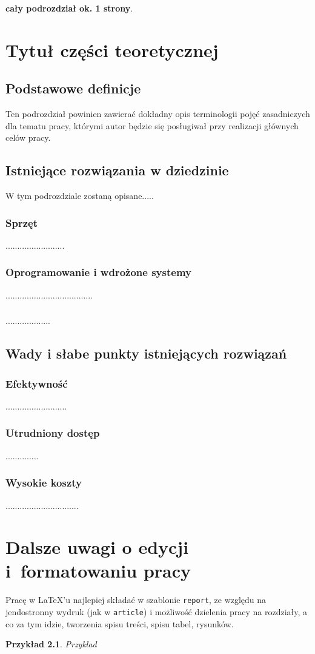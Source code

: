 \documentclass[12pt]{report}
\newtheorem{example}{Przykład}[chapter] %
\begin{document}
{\bf cały podrozdział ok. 1 strony}.




\chapter{Tytuł części teoretycznej} \label{etykietarozdzialu2}
\section{Podstawowe definicje}
Ten podrozdział powinien zawierać dokładny opis terminologii  pojęć zasadniczych dla tematu pracy, którymi autor będzie się posługiwał przy realizacji głównych celów pracy. 


\section{Istniejące rozwiązania w dziedzinie}
W tym podrozdziale zostaną opisane.....
\subsection{Sprzęt}
.........................
\subsection{Oprogramowanie i wdrożone systemy}
.....................................
\subsection{}
...................

\section{Wady i słabe punkty istniejących rozwiązań}
\subsection{Efektywność}
..........................
\subsection{Utrudniony dostęp}
..............
\subsection{Wysokie koszty}
...............................

\chapter{Dalsze uwagi o edycji i~formatowaniu pracy}
Pracę w \LaTeX'u najlepiej składać w szablonie {\tt report}, ze względu na jendostronny wydruk (jak w {\tt article}) i możliwość dzielenia pracy na rozdziały, a co za tym idzie, tworzenia spisu treści, spisu tabel, rysunków. 
\begin{example}
Przyklad
\end{example}
\end{document}
